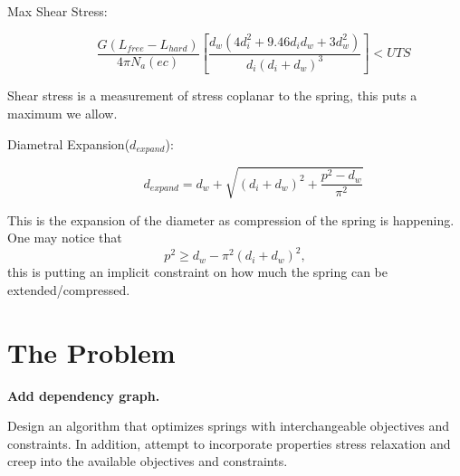 \documentclass[10pt]{article}
\begin{document}
		\begin{description}
			 \item[Max Shear Stress:]\begin{equation} \frac{G(L_{free} - L_{hard})}{4 \pi N_{a} (ec)} \left[\frac{d_{w} (4d_{i}^{2} + 9.46d_{i} 
d_{w} + 3 d_{w}^{2})}{d_{i}(d_{i}+d_{w})^{3}}\right]< UTS\end{equation}
		\end{description}
				Shear stress is a measurement of stress coplanar to the spring, this puts a maximum we allow. 
			\begin{description}
			\item[Diametral Expansion($d_{expand}$):]\begin{equation} d_{expand} = d_{w} + \sqrt{(d_{i} + d_{w})^{2} + \frac{p^{2} - d_{w}}{\pi^{2}}}
			\end{equation}
			\end{description}
			This is the expansion of the diameter as compression of the spring is happening. One may notice that \begin{equation}p^{2} \ge d_{w} - \pi^{2} (d_{i} + d_{w})^{2},\end{equation} this is putting an implicit constraint on how much the spring can be extended/compressed.
			



			
			
\section{The Problem} 
\label{sec:The_Problem}

\textbf{Add dependency graph.} 

Design an algorithm that optimizes springs with interchangeable objectives and constraints. In addition, attempt to incorporate properties stress relaxation and creep into the available objectives and constraints. 
\end{document}
